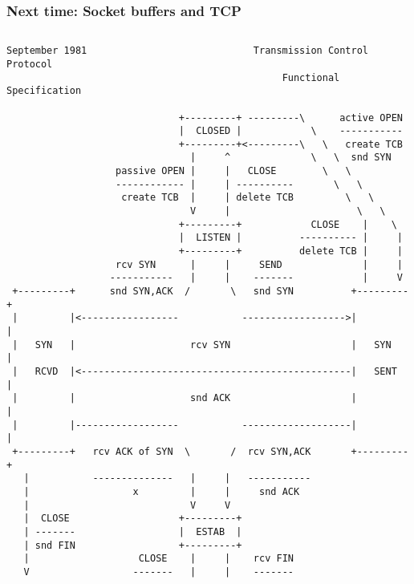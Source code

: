 \begin{frame}[fragile]
  \frametitle{Next time: Socket buffers and TCP}

  \begin{columns}[T]

  \begin{Tiny}
    \begin{verbatim}
September 1981                             Transmission Control Protocol
                                                Functional Specification

                              +---------+ ---------\      active OPEN  
                              |  CLOSED |            \    -----------  
                              +---------+<---------\   \   create TCB  
                                |     ^              \   \  snd SYN    
                   passive OPEN |     |   CLOSE        \   \           
                   ------------ |     | ----------       \   \         
                    create TCB  |     | delete TCB         \   \       
                                V     |                      \   \     
                              +---------+            CLOSE    |    \   
                              |  LISTEN |          ---------- |     |  
                              +---------+          delete TCB |     |  
                   rcv SYN      |     |     SEND              |     |  
                  -----------   |     |    -------            |     V  
 +---------+      snd SYN,ACK  /       \   snd SYN          +---------+
 |         |<-----------------           ------------------>|         |
 |   SYN   |                    rcv SYN                     |   SYN   |
 |   RCVD  |<-----------------------------------------------|   SENT  |
 |         |                    snd ACK                     |         |
 |         |------------------           -------------------|         |
 +---------+   rcv ACK of SYN  \       /  rcv SYN,ACK       +---------+
   |           --------------   |     |   -----------                  
   |                  x         |     |     snd ACK                    
   |                            V     V                                
   |  CLOSE                   +---------+                              
   | -------                  |  ESTAB  |                              
   | snd FIN                  +---------+                              
   |                   CLOSE    |     |    rcv FIN                     
   V                  -------   |     |    -------                     

\end{verbatim}
\end{Tiny}
\end{columns}
\end{frame}
